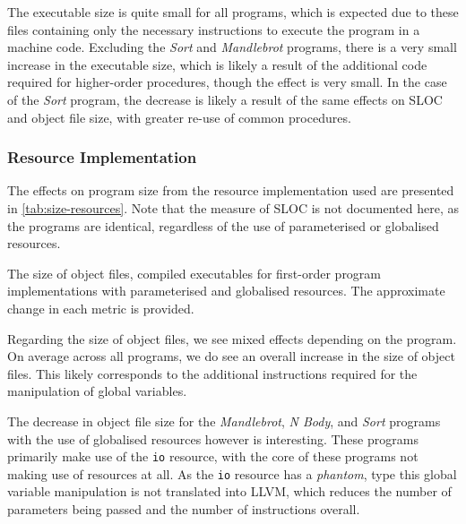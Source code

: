 The executable size is quite small for all programs, which is expected due to these files containing only the necessary instructions to execute the program in a machine code. Excluding the \textit{Sort} and \textit{Mandlebrot} programs, there is a very small increase in the executable size, which is likely a result of the additional code required for higher-order procedures, though the effect is very small. In the case of the \textit{Sort} program, the decrease is likely a result of the same effects on SLOC and object file size, with greater re-use of common procedures.

\subsubsection{Resource Implementation}

The effects on program size from the resource implementation used are presented in \cref{tab:size-resources}. Note that the measure of SLOC is not documented here, as the programs are identical, regardless of the use of parameterised or globalised resources.

\begin{table}[ht]
  \centering
  \caption[The size of object files, compiled executables for first-order program implementations with parameterised and globalised resources.]{The size of object files, compiled executables for first-order program implementations with parameterised and globalised resources. The approximate change in each metric is provided.}
  \label{tab:size-resources}
\end{table}

Regarding the size of object files, we see mixed effects depending on the program. On average across all programs, we do see an overall increase in the size of object files. This likely corresponds to the additional instructions required for the manipulation of global variables.

The decrease in object file size for the \textit{Mandlebrot}, \textit{N Body}, and \textit{Sort} programs with the use of globalised resources however is interesting. These programs primarily make use of the \texttt{io} resource, with the core of these programs not making use of resources at all. As the \texttt{io} resource has a \textit{phantom}, type this global variable manipulation is not translated into LLVM, which reduces the number of parameters being passed and the number of instructions overall.

